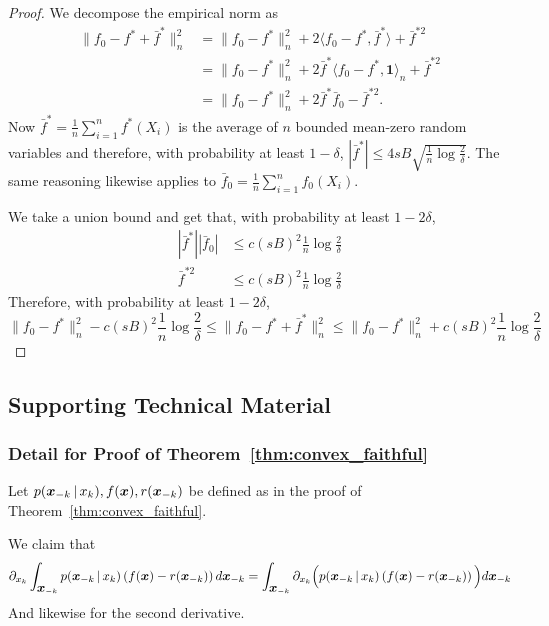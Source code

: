 \begin{proof}
We decompose the empirical norm as
\begin{align*}
\| f_0 - f^* + \bar{f}^* \|_n^2 &= \| f_0 - f^* \|_n^2 
    + 2 \langle f_0 - f^*, \bar{f}^* \rangle + \bar{f}^{*2} \\
  &= \| f_0 - f^* \|_n^2 + 2 \bar{f}^* \langle f_0 - f^*, \mathbf{1} \rangle_n + 
    \bar{f}^{*2} \\
  &= \| f_0 - f^* \|_n^2 + 2 \bar{f}^* \bar{f}_0 - \bar{f}^{*2}.
\end{align*}
Now
$\bar{f}^* = \frac{1}{n} \sum_{i=1}^n f^*(X_i)$ is the average of $n$ bounded mean-zero random variables and therefore, with probability at least $1-\delta$, $| \bar{f}^* | \leq 4 sB \sqrt{ \frac{1}{n} \log \frac{2}{\delta} }$.
The same reasoning likewise applies to $\bar{f}_0 = \frac{1}{n} \sum_{i=1}^n f_0(X_i)$.

We take a union bound and get that, with probability at least $1- 2\delta$, 
\begin{align*}
| \bar{f}^* | | \bar{f}_0 | &\leq c (sB)^2 \frac{1}{n} \log \frac{2}{\delta} \\
\bar{f}^{*2} &\leq c (sB)^2 \frac{1}{n} \log \frac{2}{\delta}
\end{align*}
Therefore, with probability at least $1 - 2\delta$,
\[
\|f_0 - f^*\|_n^2 - c (sB)^2 \frac{1}{n} \log \frac{2}{\delta} \leq
    \| f_0 - f^* + \bar{f}^* \|_n^2 \leq 
\|f_0 - f^*\|_n^2 + c (sB)^2 \frac{1}{n} \log \frac{2}{\delta}
\]
\end{proof}





\subsection{Supporting Technical Material}

\subsubsection{Detail for Proof of Theorem~\ref{thm:convex_faithful}} 
\label{sec:dominated_condition}

Let $p(\mbox{\boldmath $x$}_{-k} {\,|\,} x_k), f(\mbox{\boldmath $x$}), r(\mbox{\boldmath $x$}_{-k})$ be defined as in the proof of Theorem~\ref{thm:convex_faithful}.

We claim that 
\[
\partial_{x_k} \int_{\mbox{\boldmath $x$}_{-k}} 
  p(\mbox{\boldmath $x$}_{-k} {\,|\,} x_k)\left( f(\mbox{\boldmath $x$}) - r(\mbox{\boldmath $x$}_{-k}) \right) d\mbox{\boldmath $x$}_{-k} 
 = \int_{\mbox{\boldmath $x$}_{-k}} \partial_{x_k} \Big( p(\mbox{\boldmath $x$}_{-k} {\,|\,} x_k)\left( f(\mbox{\boldmath $x$}) - r(\mbox{\boldmath $x$}_{-k}) \right) \Big) d \mbox{\boldmath $x$}_{-k}
\]
And likewise for the second derivative.\\


